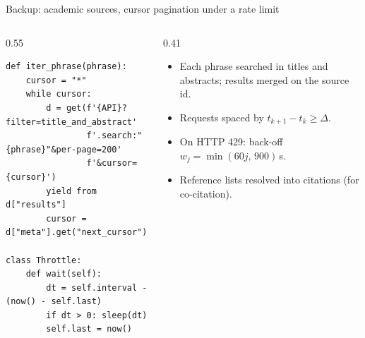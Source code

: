 \documentclass[aspectratio=169,10pt]{beamer}
\begin{document}
\begin{frame}[fragile]{Backup: academic sources, cursor pagination under a rate limit}
\begin{columns}[T]
\begin{column}{0.55\textwidth}
\begin{lstlisting}
def iter_phrase(phrase):
    cursor = "*"
    while cursor:
        d = get(f'{API}?filter=title_and_abstract'
                f'.search:"{phrase}"&per-page=200'
                f'&cursor={cursor}')
        yield from d["results"]
        cursor = d["meta"].get("next_cursor")

class Throttle:
    def wait(self):
        dt = self.interval - (now() - self.last)
        if dt > 0: sleep(dt)
        self.last = now()
\end{lstlisting}
\end{column}
\begin{column}{0.41\textwidth}\small
\begin{itemize}
\item Each phrase searched in titles and abstracts; results merged on the source id.
\item Requests spaced by $t_{k+1}-t_k \geq \Delta$.
\item On HTTP 429: back-off $w_j = \min(60j,\,900)$\,s.
\item Reference lists resolved into citations (for co-citation).
\end{itemize}
\end{column}
\end{columns}
\end{frame}
\end{document}
